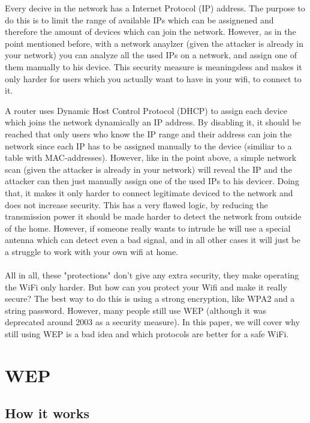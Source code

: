 \documentclass[a4paper,12pt,pagesize,headsepline,bibtotoc,titlepage]{scrartcl}
\begin{document}
Every decive in the network has a Internet Protocol (IP) address. The purpose to do this is to limit the range of available IPs which can be assignened and therefore the amount of devices which can join the network. However, as in the point mentioned before, with a network anaylzer (given  the attacker is already in your network) you can analyze all the used IPs on a network, and assign one of them manually to his device. This security measure is meaningsless and makes it only harder for users which you actually want to have in your wifi, to connect to it.

A router uses Dynamic Host Control Protocol (DHCP) to assign each device which joins the network dynamically an IP address. By disabling it, it should be reached that only users who know the IP range and their address can join the network since each IP has to be assigned manually to the device (similiar to a table with MAC-addresses). However, like in the point above, a simple network scan (given  the attacker is already in your network) will reveal the IP and the attacker can then just manually assign one of the used IPs to his devicer. Doing that, it makes it only harder to connect legitimate deviced to the network and does not increase security.
This has a very flawed logic, by reducing the transmission power it should be made harder to detect the network from outside of the home. However, if someone really wants to intrude he will use a special antenna which can detect even a bad signal, and in all other cases it will just be a struggle to work with your own wifi at home.
\\
\\
All in all, these "protections" don't give any extra security, they make operating the WiFi only harder.
But how can you protect your Wifi and make it really secure?
The best way to do this is using a strong encryption, like WPA2 and a string password.
However, many people still use WEP (although it was deprecated around 2003 as a security measure). In this paper, we will cover why still using WEP is a bad idea and which protocols are better for a safe WiFi.

\newpage
\section{WEP}

\subsection{How it works}
\end{document}
